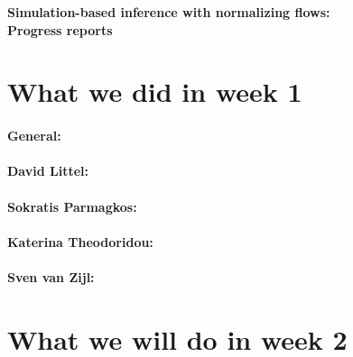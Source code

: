 \documentclass{article}
\begin{document}
\begin{center}{\Large \textbf{
    Simulation-based inference with normalizing flows:\\
    Progress reports
    }}
\end{center}

\section*{What we did in week 1}

\paragraph{General:}

\paragraph{David Littel:}

\paragraph{Sokratis Parmagkos:}

\paragraph{Katerina Theodoridou:}

\paragraph{Sven van Zijl:}

\section*{What we will do in week 2}
\end{document}
